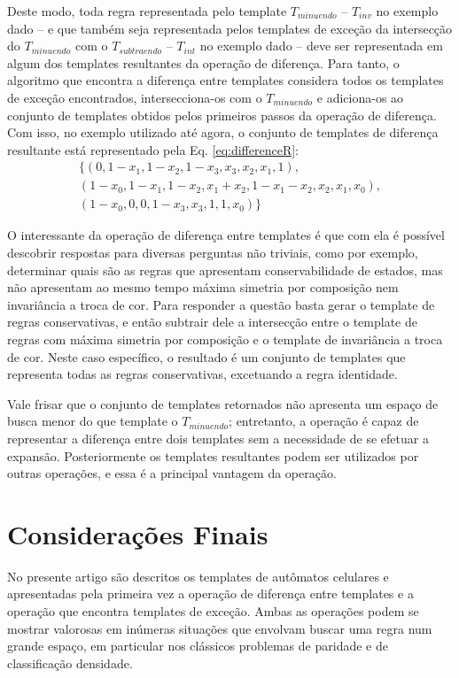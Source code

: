 \documentclass[12pt, a4paper]{article}
\begin{document}
Deste modo, toda regra representada pelo template $T_{minuendo}$ -- $T_{inv}$ no exemplo dado -- e que também seja representada pelos templates de exceção da intersecção do $T_{minuendo}$ com o $T_{subtraendo}$ -- $T_{int}$ no exemplo dado -- deve ser representada em algum dos templates resultantes da operação de diferença. Para tanto, o algoritmo que encontra a diferença entre templates considera todos os templates de exceção encontrados, intersecciona-os com o $T_{minuendo}$ e adiciona-os ao conjunto de templates obtidos pelos primeiros passos da operação de diferença. Com isso, no exemplo utilizado até agora, o conjunto de templates de diferença resultante está representado pela Eq. \ref{eq:differenceR}:\begin{equation}
\begin{split}
\{(0, 1 - x_1, 1 - x_2, 1 - x_3, x_3, x_2, x_1, 1), \\
(1 - x_0, 1 - x_1, 1 - x_2, x_1 + x_2, 1 - x_1 - x_2, x_2, x_1, x_0), \\
(1 - x_0, 0, 0, 1 - x_3, x_3, 1, 1, x_0)\}
\label{eq:differenceR}
\end{split}
\end{equation}

O interessante da operação de diferença entre templates é que com ela é possível descobrir respostas para diversas perguntas não triviais, como por exemplo, determinar quais são as regras que apresentam conservabilidade de estados, mas não apresentam ao mesmo tempo máxima simetria por composição nem invariância a troca de cor. Para responder a questão basta gerar o template de regras conservativas, e então subtrair dele a intersecção entre o template de regras com máxima simetria por composição e o template de invariância a troca de cor. Neste caso específico, o resultado é um conjunto de templates que representa todas as regras conservativas, excetuando a regra identidade.

Vale frisar que o conjunto de templates retornados não apresenta um espaço de busca menor do que template o $T_{minuendo}$; entretanto, a operação é capaz de representar a diferença entre dois templates sem a necessidade de se efetuar a expansão. Posteriormente os templates resultantes podem ser utilizados por outras operações, e essa é a principal vantagem da operação. 









\section{Considerações Finais}
\label{sec:consideracoes_finais}
No presente artigo são descritos os templates de autômatos celulares e apresentadas pela primeira vez a operação de diferença entre templates e a operação que encontra templates de exceção. Ambas as operações podem se mostrar valorosas em inúmeras situações que envolvam buscar uma regra num grande espaço, em particular nos clássicos problemas de paridade e de classificação densidade.
\end{document}
